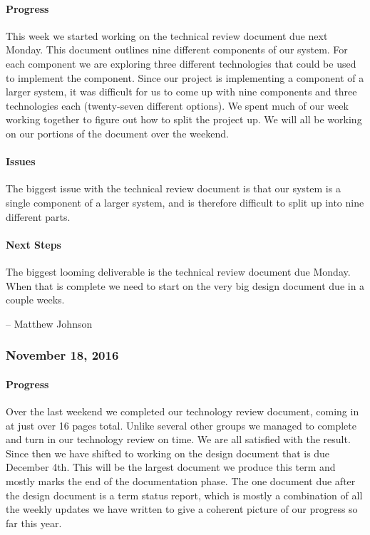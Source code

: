 \documentclass[10pt,onecolumn,journal,draftclsnofoot]{IEEEtran}
\begin{document}
\paragraph{Progress} 

This week we started working on the technical review document due next
Monday. This document outlines nine different components of our system.
For each component we are exploring three different technologies that
could be used to implement the component. Since our project is
implementing a component of a larger system, it was difficult for us to
come up with nine components and three technologies each (twenty-seven
different options). We spent much of our week working together to figure
out how to split the project up. We will all be working on our portions
of the document over the weekend.

\paragraph{Issues} 

The biggest issue with the technical review document is that our system
is a single component of a larger system, and is therefore difficult to
split up into nine different parts.

\paragraph{Next Steps} 

The biggest looming deliverable is the technical review document due
Monday. When that is complete we need to start on the very big design
document due in a couple weeks.

-- Matthew Johnson

\subsubsection{November 18, 2016} 

\paragraph{Progress} 

Over the last weekend we completed our technology review document,
coming in at just over 16 pages total. Unlike several other groups we
managed to complete and turn in our technology review on time. We are
all satisfied with the result. Since then we have shifted to working on
the design document that is due December 4th. This will be the largest
document we produce this term and mostly marks the end of the
documentation phase. The one document due after the design document is a
term status report, which is mostly a combination of all the weekly
updates we have written to give a coherent picture of our progress so
far this year.
\end{document}
